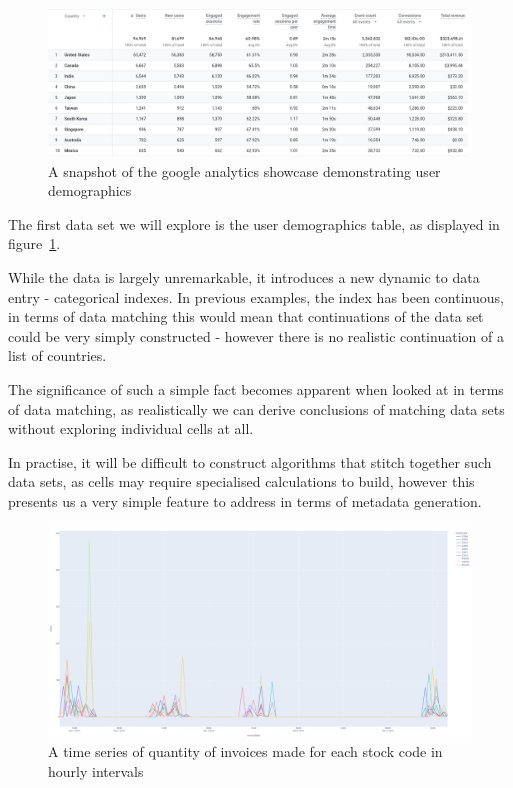 \begin{figure}[H]
    \centering
    \includegraphics[width=12cm]{figures/real_data_examples/google_analytics_user_demographics}
    \caption{A snapshot of the google analytics showcase demonstrating user demographics}
    \label{fig:google_analytics_demographics}
\end{figure}

\bigbreak
The first data set we will explore is the user demographics table, as displayed in
figure~\ref{fig:google_analytics_demographics}.

While the data is largely unremarkable, it introduces a new dynamic to data entry - categorical indexes.
In previous examples, the index has been continuous, in terms of data matching this would mean that continuations of the
data set could be very simply constructed - however there is no realistic continuation of a list of countries.

The significance of such a simple fact becomes apparent when looked at in terms of data matching, as realistically we
can derive conclusions of matching data sets without exploring individual cells at all.

In practise, it will be difficult to construct algorithms that stitch together such data sets, as cells may require
specialised calculations to build, however this presents us a very simple feature to address in terms of metadata
generation.


\begin{figure}[H]
    \centering
    \includegraphics[width=12cm]{figures/real_data_examples/real_data_invoice_timeseries}
    \caption{A time series of quantity of invoices made for each stock code in hourly intervals}
    \label{fig:invoice_timeseries}
\end{figure}

